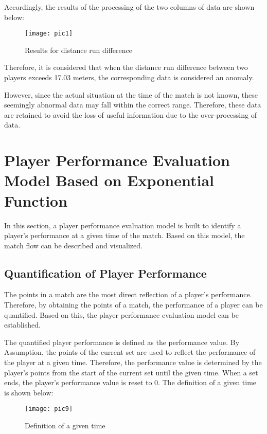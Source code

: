 \documentclass[12pt]{article}  %
\begin{document}
\begin{enumerate}[\bfseries 1.]
	Accordingly, the results of the processing of the two columns of data are shown below:
	\begin{figure}[htbp]  %
		\centering  %
		\texttt{[image: pic1]} %
		\caption{Results for distance run difference}  
		\label{pic1}
	\end{figure}
	
	Therefore, it is considered that when the distance run difference between two players exceeds 17.03 meters, the corresponding data is considered an anomaly.
	
	However, since the actual situation at the time of the match is not known, these seemingly abnormal data may fall within the correct range. Therefore, these data are retained to avoid the loss of useful information due to the over-processing of data.
\end{enumerate}

\section{Player Performance Evaluation Model Based on Exponential Function}
In this section, a player performance evaluation model is built to identify a player's performance at a given time of the match. Based on this model, the match flow can be described and visualized.

\subsection{Quantification of Player Performance}
The points in a match are the most direct reflection of a player's performance. Therefore, by obtaining the points of a match, the performance of a player can be quantified. Based on this, the player performance evaluation model can be established.

The quantified player performance is defined as the performance value. By Assumption, the points of the current set are used to reflect the performance of the player at a given time. Therefore, the performance value is determined by the player's points from the start of the current set until the given time. When a set ends, the player's performance value is reset to 0. The definition of a given time is shown below:

\begin{figure}[htbp]  %
	\centering  %
	\texttt{[image: pic9]} %
	\caption{Definition of a given time}  
	\label{pic9}
\end{figure}
\end{document}
